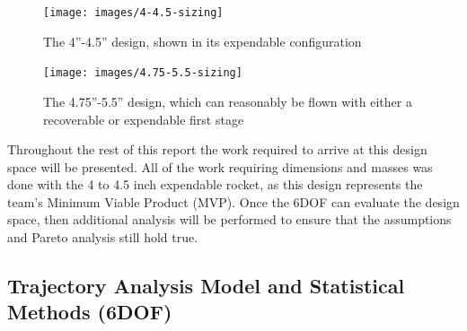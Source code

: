 \begin{figure}
    \centering
    \texttt{[image: images/4-4.5-sizing]}
    \caption{The 4''-4.5'' design, shown in its expendable configuration}
    \label{figure:smaller-point}
\end{figure}

\begin{figure}
    \centering
    \texttt{[image: images/4.75-5.5-sizing]}
    \caption{The 4.75''-5.5'' design, which can reasonably be flown with either a recoverable or expendable first stage}
    \label{figure:larger-point}
\end{figure}

Throughout the rest of this report the work required to arrive at this design space will be presented. All of the work requiring dimensions and masses was done with the 4 to 4.5 inch expendable rocket, as this design represents the team’s Minimum Viable Product (MVP). Once the 6DOF can evaluate the design space, then additional analysis will be performed to ensure that the assumptions and Pareto analysis still hold true.



\subsection{Trajectory Analysis Model and Statistical Methods (6DOF)} \label{section:6dof}

